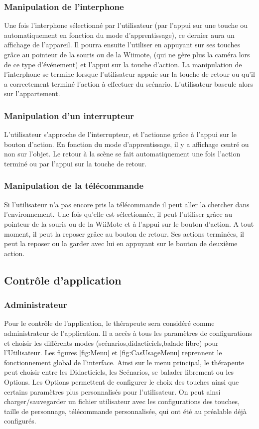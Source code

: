 \subsubsection{Manipulation de l’interphone }
Une fois l’interphone sélectionné par l’utilisateur (par l’appui sur une touche ou automatiquement en fonction du mode d’apprentissage), ce dernier aura un affichage de l’appareil. Il pourra ensuite l’utiliser en appuyant sur ses touches grâce au pointeur de la souris ou de la Wiimote, (qui ne gère plus la caméra lors de ce type d’événement) et l’appui sur la touche d’action. La manipulation de l’interphone se termine lorsque l’utilisateur appuie sur la touche de retour ou qu’il a correctement terminé l’action à effectuer du scénario. L’utilisateur bascule alors sur l’appartement.

\subsubsection{Manipulation d’un interrupteur}
L’utilisateur s’approche de l’interrupteur, et l’actionne grâce à l’appui sur le bouton d’action. En fonction du mode d’apprentissage, il y a affichage centré ou non sur l’objet. Le retour à la scène se fait automatiquement une fois l’action terminé ou par l’appui sur la touche de retour.

\subsubsection{Manipulation de la télécommande}
Si l’utilisateur n’a pas encore pris la télécommande il peut aller la chercher dans l’environnement. Une fois qu’elle est sélectionnée, il peut l’utiliser grâce au pointeur de la souris ou de la WiiMote et à l’appui sur le bouton d’action. A tout moment, il peut la reposer grâce au bouton de retour. Ses actions terminées, il peut la reposer ou la garder avec lui en appuyant sur le bouton de deuxième action. 

\subsection{Contrôle d’application}
\subsubsection{Administrateur}
Pour le contrôle de l'application, le thérapeute sera considéré comme administrateur de l'application. Il a accès à 
tous les paramètres de configurations et choisir les différents modes (scénarios,didacticiels,balade libre) pour l'Utilisateur.
\newline
Les figures \ref{fig:Menu} et \ref{fig:CasUsageMenu} reprennent le fonctionnement global de l'interface. Ainsi sur le menu principal, le thérapeute peut choisir entre les Didacticiels, les Scénarios, se balader librement ou les Options.
\newline
Les Options permettent de configurer le choix des touches ainsi que certains paramètres plus personnalisés pour l'utilisateur. On peut ainsi charger/sauvegarder un fichier utilisateur avec les configurations des touches, taille de personnage, télécommande personnalisée, qui ont été au préalable déjà configurés. 

